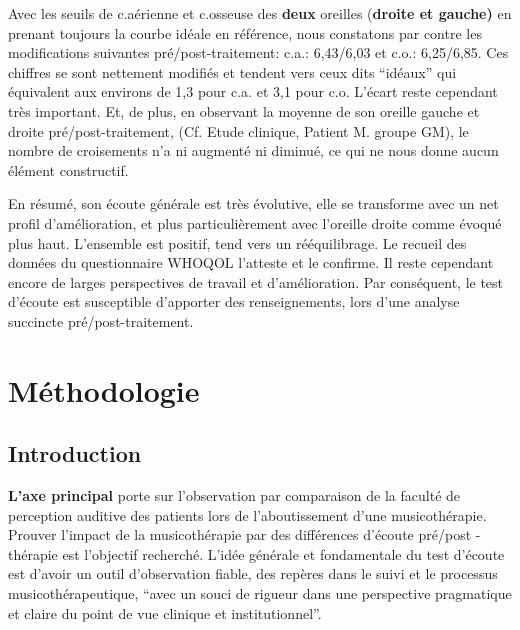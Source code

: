 Avec les
seuils
de c.aérienne et c.osseuse des\textbf{ deux} oreilles (\textbf{droite et gauche)} en prenant toujours 
 la courbe idéale en référence, nous
constatons par contre les modifications suivantes pré/post-traitement:
c.a.: 6,43/6,03 et c.o.: 6,25/6,85.
Ces chiffres se sont nettement
modifiés et tendent vers
ceux dits ``idéaux''  qui équivalent aux environs de 1,3 pour
c.a. et 3,1 pour c.o. L'écart reste cependant très important. %
Et, de plus, en observant la moyenne de son oreille gauche et droite pré/post-traitement,
(Cf. Etude clinique, Patient M. groupe GM), le
nombre de croisements n'a ni augmenté ni diminué, ce qui ne nous donne
aucun élément constructif.
 
En résumé, son écoute générale est très évolutive, elle se transforme avec un net profil d'amélioration, et 
plus particulièrement avec l'oreille
droite comme évoqué plus haut. L'ensemble est positif, tend vers un
rééquilibrage. Le recueil des données du
questionnaire WHOQOL l'atteste et le confirme.
Il reste cependant encore de larges perspectives de travail et d'amélioration.
Par conséquent, le test d'écoute est susceptible d'apporter des renseignements, lors
d'une analyse succincte pré/post-traitement.


\chapter{Méthodologie} 

\section{Introduction}
 
\textbf{L'axe principal} porte sur l'observation par comparaison de la faculté de perception auditive des 
patients lors de l'aboutissement d'une musicothérapie.
Prouver l'impact de la musicothérapie par des différences d'écoute pré/post - 
thérapie est l'objectif  recherché.
L'idée générale et fondamentale du test d'écoute est d'avoir un outil d'observation fiable, des repères 
dans le suivi et le processus musicothérapeutique, \enquote {avec un souci de rigueur dans une 
	perspective pragmatique et claire du point de vue clinique et institutionnel}\autocite[p. 
36]{vrait_musicotherapie_2018}. 

